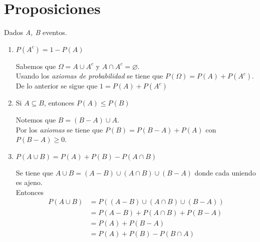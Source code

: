 \section{Proposiciones}
Dados \textit{A, B} eventos.
\begin{enumerate}
  \item $P(A^c) = 1 - P(A)$
    \begin{myproof}
      Sabemos que $\Omega = A \cup A^c$ y $A \cap A^c = \varnothing$. \\
      Usando los \textit{axiomas de probabilidad} se tiene que $P(\Omega) = P(A) + P(A^c)$.\\
      De lo anterior se sigue que $1 = P(A) + P(A^c)$
      \begin{center}  \end{center}
    \end{myproof}

    \newpage
  \item Si $A \subseteq B$, entonces $P(A) \le P(B)$
    \begin{myproof}
      Notemos que $B = (B - A) \cup A$.\\ 
      Por los \textit{axiomas} se tiene que $P(B) = P(B-A) + P(A)$ con $P(B - A) \ge 0$.
      \begin{center}  \end{center}
    \end{myproof}
    
  \item $P(A \cup B) = P(A) + P(B) - P(A \cap B)$
    \begin{myproof}
      Se tiene que $A \cup B = (A - B) \cup (A \cap B) \cup (B - A)$ donde cada uniendo es ajeno.\\
      Entonces
      \begin{align*}
         P(A \cup B) &= P((A - B) \cup (A \cap B) \cup (B - A))\\
                  &= P(A-B) + P(A \cap B) + P(B-A)\\
                  &= P(A) + P(B-A)\\
                  &= P(A)  + P(B) - P(B \cap A)\\
      \end{align*}
    \end{myproof}
\end{enumerate}


